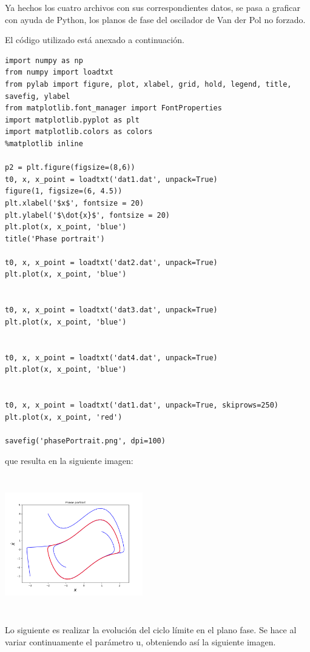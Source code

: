 \documentclass{article}
\begin{document}
Ya hechos los cuatro archivos con sus correspondientes datos, se pasa a graficar con ayuda de Python, los planos de fase del oscilador de Van der Pol no forzado.

El código utilizado está anexado a continuación.

\begin{verbatim}
import numpy as np
from numpy import loadtxt
from pylab import figure, plot, xlabel, grid, hold, legend, title, savefig, ylabel
from matplotlib.font_manager import FontProperties
import matplotlib.pyplot as plt
import matplotlib.colors as colors
%matplotlib inline

p2 = plt.figure(figsize=(8,6))
t0, x, x_point = loadtxt('dat1.dat', unpack=True)
figure(1, figsize=(6, 4.5))
plt.xlabel('$x$', fontsize = 20)
plt.ylabel('$\dot{x}$', fontsize = 20)
plt.plot(x, x_point, 'blue')
title('Phase portrait')

t0, x, x_point = loadtxt('dat2.dat', unpack=True)
plt.plot(x, x_point, 'blue')


t0, x, x_point = loadtxt('dat3.dat', unpack=True)
plt.plot(x, x_point, 'blue')


t0, x, x_point = loadtxt('dat4.dat', unpack=True)
plt.plot(x, x_point, 'blue')


t0, x, x_point = loadtxt('dat1.dat', unpack=True, skiprows=250)
plt.plot(x, x_point, 'red')

savefig('phasePortrait.png', dpi=100)

\end{verbatim}

que resulta en la siguiente imagen:

\begin{center}
    \includegraphics[width=6cm, height=6cm]{Van1.png}
\end{center}

Lo siguiente es realizar la evolución del ciclo límite en el plano fase. Se hace al variar continuamente el parámetro u, obteniendo así la siguiente imagen.
\end{document}
